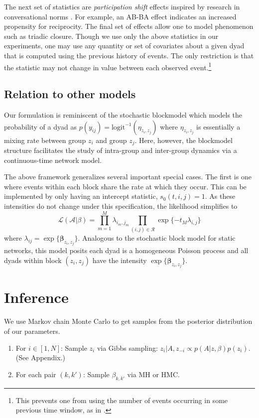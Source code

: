 \documentclass[11pt]{article}
\begin{document}
The next set of statistics are \emph{participation shift} effects inspired by research in conversational norms \cite{Gibson2003}.  For example, an AB-BA effect indicates an increased propensity for reciprocity.  The final set of effects allow one to model phenomenon such as triadic closure.  Though we use only the above statistics in our experiments, one may use any quantity or set of covariates about a given dyad that is computed using the previous history of events.  The only restriction is that the statistic may not change in value between each observed event.\footnote{This prevents one from using the number of events occurring in some previous time window, as in \cite{Gunawardana2011}.}

\subsection{Relation to other models}

Our formulation is reminiscent of the stochastic blockmodel \cite{Nowicki2001,Kemp} which models the probability of a dyad as $p(y_{ij}) =\mbox{logit}^{-1}( \eta_{z_i,z_j})$ where $\eta_{z_i,z_j}$ is essentially a mixing rate between group $z_i$ and group $z_j$.  Here, however, the blockmodel structure facilitates the study of intra-group and inter-group dynamics via a continuous-time network model.

The above framework generalizes several important special cases.  The first is one where events within each block share the rate at which they occur.  This can be implemented by only having an intercept statistic, $s_0(t,i,j) = 1$.  As these intensities do not change under this specification, the likelihood simplifies to 
$$\mathcal{L}(\mathcal{A}|\beta) = \prod_{m=1}^M \lambda_{i_m,j_m} \prod_{(i,j) \in \mathcal{R}} \exp\{-t_M \lambda_{i,j}\}$$
where $ \lambda_{ij} = \exp\{\boldsymbol{\beta}_{z_i,z_j}\}$.  Analogous to the stochastic block model for static networks, this model posits each dyad is a homogeneous Poisson process and all dyads within block $(z_i,z_j)$ have the intensity $\exp\{\boldsymbol{\beta}_{z_i,z_j}\}$.

\section{Inference}

We use Markov chain Monte Carlo to get samples from the posterior distribution of our parameters.  

\begin{enumerate}
\item For $i \in [1,N]$: Sample $z_i$ via Gibbs sampling: 
$z_i | A, z_{-i} \propto p(A|z,\beta) p(z_i)$.  (See Appendix.)
\item For each pair $(k,k')$: Sample $\beta_{k,k'}$ via MH or HMC.
\end{enumerate}
\end{document}
